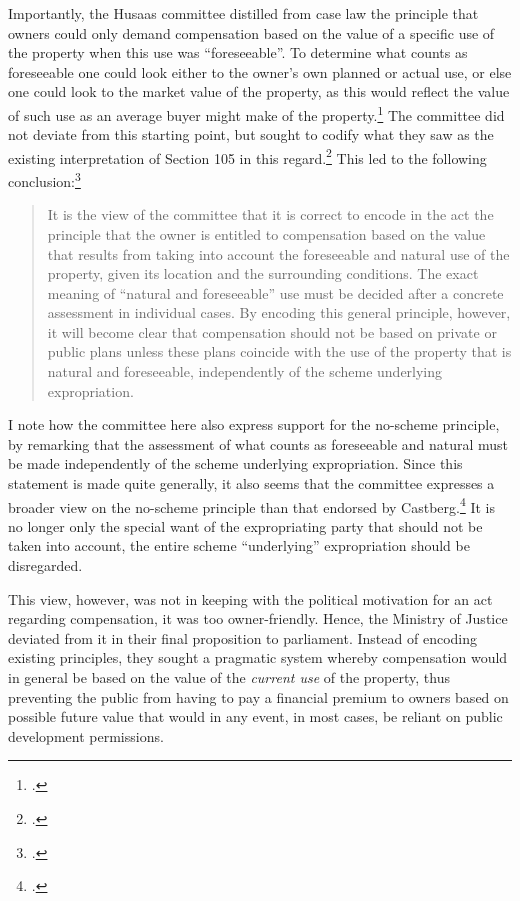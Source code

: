 Importantly, the Husaas committee distilled from case law the principle that owners could only demand compensation based on the value of a specific use of the property when this use was ``foreseeable''. To determine what counts as foreseeable one could look either to the owner's own planned or actual use, or else one could look to the market value of the property, as this would reflect the value of such use as an average buyer might make of the property.\footcite[152]{nut69} The committee did not deviate from this starting point, but sought to codify what they saw as the existing interpretation of Section 105 in this regard.\footcite[134]{nut69} This led to the following conclusion:\footnote{\cite[142]{nut69}.}

\begin{quote}
It is the view of the committee that it is correct to encode in the act the principle that the owner is entitled to compensation based on the value that results from taking into account the foreseeable and natural use of the property, given its location and the surrounding conditions. The exact meaning of ``natural and foreseeable'' use must be decided after a concrete assessment in individual cases. By encoding this general principle, however, it will become clear that compensation should not be based on private or public plans unless these plans coincide with the use of the property that is natural and foreseeable, independently of the scheme underlying expropriation.
\end{quote}

I note how the committee here also express support for the no-scheme principle, by remarking that the assessment of what counts as foreseeable and natural must be made independently of the scheme underlying expropriation. Since this statement is made quite generally, it also seems that the committee expresses a broader view on the no-scheme principle than that endorsed by Castberg.\footcite[268]{castberg64b} It is no longer only the special want of the expropriating party that should not be taken into account, the entire scheme ``underlying'' expropriation should be disregarded.

This view, however, was not in keeping with the political motivation for an act regarding compensation, it was too owner-friendly. Hence, the Ministry of Justice deviated from it in their final proposition to parliament. Instead of encoding existing  principles, they sought a pragmatic system whereby compensation would in general be based on the value of the \emph{current use} of the property, thus preventing the public from having to pay a financial premium to owners based on possible future value that would in any event, in most cases, be reliant on public development permissions. %

